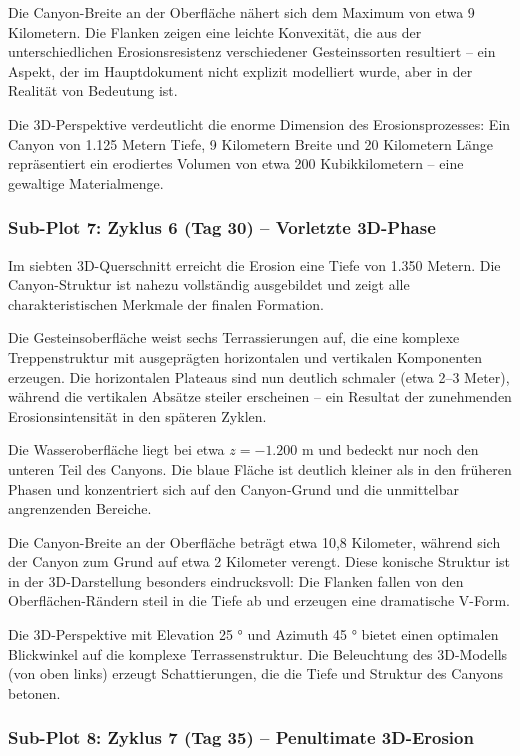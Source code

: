 Die Canyon-Breite an der Oberfläche nähert sich dem Maximum von etwa 9 Kilometern. Die Flanken zeigen eine leichte Konvexität, die aus der unterschiedlichen Erosionsresistenz verschiedener Gesteinssorten resultiert -- ein Aspekt, der im Hauptdokument nicht explizit modelliert wurde, aber in der Realität von Bedeutung ist.

Die 3D-Perspektive verdeutlicht die enorme Dimension des Erosionsprozesses: Ein Canyon von 1.125 Metern Tiefe, 9 Kilometern Breite und 20 Kilometern Länge repräsentiert ein erodiertes Volumen von etwa 200 Kubikkilometern -- eine gewaltige Materialmenge.

\subsubsection*{Sub-Plot 7: Zyklus 6 (Tag 30) -- Vorletzte 3D-Phase}

Im siebten 3D-Querschnitt erreicht die Erosion eine Tiefe von 1.350 Metern. Die Canyon-Struktur ist nahezu vollständig ausgebildet und zeigt alle charakteristischen Merkmale der finalen Formation.

Die Gesteinsoberfläche weist sechs Terrassierungen auf, die eine komplexe Treppenstruktur mit ausgeprägten horizontalen und vertikalen Komponenten erzeugen. Die horizontalen Plateaus sind nun deutlich schmaler (etwa 2--3 Meter), während die vertikalen Absätze steiler erscheinen -- ein Resultat der zunehmenden Erosionsintensität in den späteren Zyklen.

Die Wasseroberfläche liegt bei etwa $z = -1.200$ m und bedeckt nur noch den unteren Teil des Canyons. Die blaue Fläche ist deutlich kleiner als in den früheren Phasen und konzentriert sich auf den Canyon-Grund und die unmittelbar angrenzenden Bereiche.

Die Canyon-Breite an der Oberfläche beträgt etwa 10,8 Kilometer, während sich der Canyon zum Grund auf etwa 2 Kilometer verengt. Diese konische Struktur ist in der 3D-Darstellung besonders eindrucksvoll: Die Flanken fallen von den Oberflächen-Rändern steil in die Tiefe ab und erzeugen eine dramatische V-Form.

Die 3D-Perspektive mit Elevation 25 ° und Azimuth 45 ° bietet einen optimalen Blickwinkel auf die komplexe Terrassenstruktur. Die Beleuchtung des 3D-Modells (von oben links) erzeugt Schattierungen, die die Tiefe und Struktur des Canyons betonen.

\subsubsection*{Sub-Plot 8: Zyklus 7 (Tag 35) -- Penultimate 3D-Erosion}

